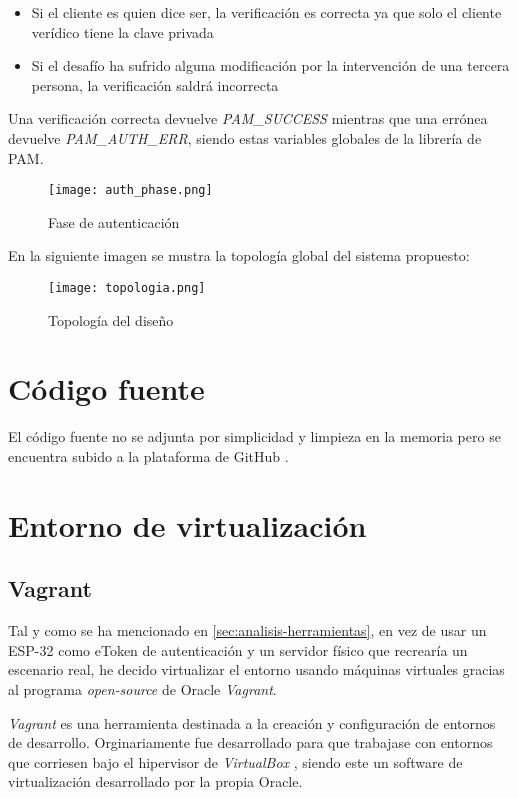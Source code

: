 \begin{itemize}
    \item Si el cliente es quien dice ser, la verificación es correcta ya que solo el cliente verídico tiene la clave privada
    \item Si el desafío ha sufrido alguna modificación por la intervención de una tercera persona, la verificación saldrá incorrecta
\end{itemize}

Una verificación correcta devuelve \textit{PAM\_SUCCESS} mientras que una errónea devuelve \textit{PAM\_AUTH\_ERR}, siendo estas 
variables globales de la librería de PAM.  

\begin{figure}[H]
    \centering
    \texttt{[image: auth\_phase.png]}
    \caption{Fase de autenticación}
\end{figure}

En la siguiente imagen se mustra la topología global del sistema propuesto:

\begin{figure}[H]
    \centering
    \texttt{[image: topologia.png]}
    \caption{Topología del diseño}
\end{figure}

\section{Código fuente}

El código fuente no se adjunta por simplicidad y limpieza en la memoria pero se encuentra subido a la plataforma de GitHub 
\cite{garcia_sergiogp98mqtt-pam_2021}. 

\section{Entorno de virtualización}

\subsection{Vagrant}

Tal y como se ha mencionado en \ref{sec:analisis-herramientas}, en vez de usar un ESP-32 como eToken de autenticación y un servidor 
físico que recrearía un escenario real, he decido virtualizar el entorno usando máquinas virtuales gracias al programa 
\textit{open-source} de Oracle \textit{Vagrant}.

\textit{Vagrant} es una herramienta destinada a la creación y configuración de entornos de desarrollo. Orginariamente fue 
desarrollado para que trabajase con entornos que corriesen bajo el hipervisor de \textit{VirtualBox} \cite{virtualbox}, siendo 
este un software de virtualización desarrollado por la propia Oracle.

